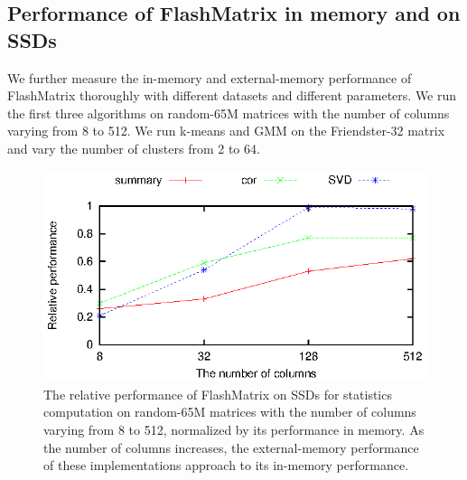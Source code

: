 \subsection{Performance of FlashMatrix in memory and on SSDs}

We further measure the in-memory and external-memory performance of FlashMatrix
thoroughly with different datasets and different parameters. We run the first
three algorithms on random-65M matrices
with the number of columns varying from 8 to 512. We run k-means
and GMM on the Friendster-32 matrix and vary the number of clusters from 2 to 64.

\begin{figure}
	\begin{center}
		\footnotesize
		\includegraphics{FlashMatrix_figs/IM-vs-EM-stat.eps}
		\caption{The relative performance of FlashMatrix on SSDs for
			statistics computation on random-65M matrices with the number of
			columns varying from 8 to 512, normalized by its performance
			in memory. As the number of columns increases, the external-memory
			performance of these implementations approach to its in-memory
		performance.}
		\label{perf:stat}
	\end{center}
\end{figure}


